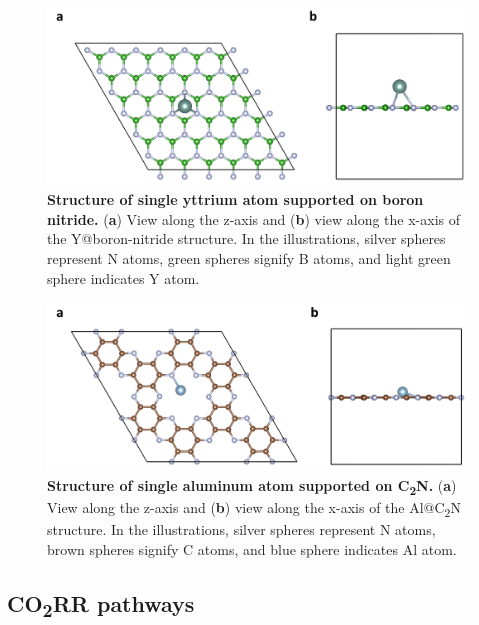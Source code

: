 \begin{figure}[htbp]
  \centering
  \includegraphics[width=\textwidth]{supp_fig6_Y-BN.png}
  \caption{\textbf{Structure of single yttrium atom supported on boron nitride.}
  (\textbf{a}) View along the z-axis and (\textbf{b}) view along the x-axis
  of the Y@boron-nitride structure.
  In the illustrations, silver spheres represent N atoms, green spheres
  signify B atoms, and light green sphere indicates Y atom.}
  \label{supp_fig6:Y-BN}
\end{figure}

\begin{figure}[htbp]
  \centering
  \includegraphics[width=\textwidth]{supp_fig7_Al-C2N.png}
  \caption{\textbf{Structure of single aluminum atom supported on C\textsubscript{2}N.}
  (\textbf{a}) View along the z-axis and (\textbf{b}) view along the x-axis
  of the Al@C\textsubscript{2}N structure.
  In the illustrations, silver spheres represent N atoms, brown spheres
  signify C atoms, and blue sphere indicates Al atom.}
  \label{supp_fig7:Al-C2N}
\end{figure}

\subsection[CO2RR pathways]{CO\textsubscript{2}RR pathways}
\label{supp_sec2.2_co2rr_paths}

